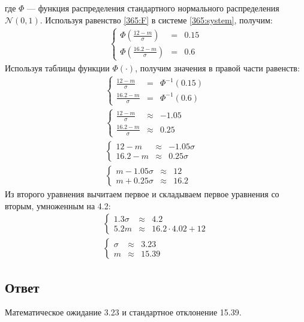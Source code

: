 где $\Phi$ --- функция распределения стандартного нормального распределения $\mathcal{N}(0, 1)$. Используя равенство \eqref{365:F} в системе \eqref{365:system}, получим:
\begin{gather}
    \left \{
    \begin{array}{lcl}
        \Phi \left ( \frac{12-m}{\sigma} \right )   & = & 0.15 \\
        \Phi \left ( \frac{16.2-m}{\sigma} \right ) & = & 0.6
    \end{array}
    \right .
\end{gather}
Используя таблицы функции $\Phi(\cdot)$, получим значения в правой части равенств:
\begin{gather}
    \left \{
    \begin{array}{lcl}
        \frac{12-m}{\sigma}   & = & \Phi^{-1} \left (  0.15 \right ) \\
        \frac{16.2-m}{\sigma} & = & \Phi^{-1} \left ( 0.6 \right )
    \end{array}
    \right . \\
    \left \{
    \begin{array}{lcl}
        \frac{12-m}{\sigma}   & \approx & -1.05 \\
        \frac{16.2-m}{\sigma} & \approx & 0.25
    \end{array}
    \right . \\
    \left \{
    \begin{array}{lcl}
        12 - m   & \approx & -1.05 \sigma \\
        16.2 - m & \approx & 0.25 \sigma
    \end{array}
    \right . \\
    \left \{
    \begin{array}{lcl}
        m - 1.05 \sigma & \approx & 12   \\
        m + 0.25 \sigma & \approx & 16.2
    \end{array}
    \right .
\end{gather}
Из второго уравнения вычитаем первое и складываем первое уравнения со вторым, умноженным на 4.2:
\begin{gather}
    \left \{
    \begin{array}{lcl}
        1.3 \sigma & \approx & 4.2                  \\
        5.2 m      & \approx & 16.2 \cdot 4.02 + 12
    \end{array}
    \right . \\
    \left \{
    \begin{array}{lcl}
        \sigma & \approx & 3.23  \\
        m      & \approx & 15.39
    \end{array}
    \right .
\end{gather}

\subsection*{Ответ}
Математическое ожидание 3.23 и стандартное отклонение 15.39.
